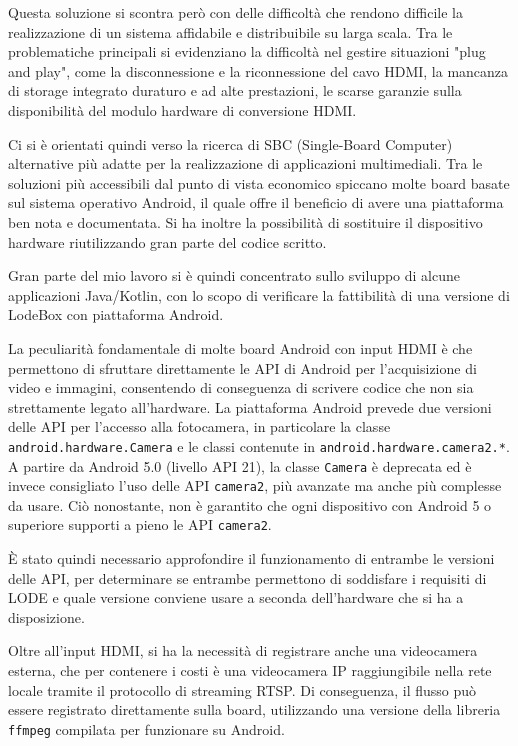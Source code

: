Questa soluzione si scontra però con delle difficoltà che rendono difficile la realizzazione di un sistema affidabile e distribuibile su larga scala. Tra le problematiche principali si evidenziano la difficoltà nel gestire situazioni "plug and play", come la disconnessione e la riconnessione del cavo HDMI, la mancanza di storage integrato duraturo e ad alte prestazioni, le scarse garanzie sulla disponibilità del modulo hardware di conversione HDMI.

Ci si è orientati quindi verso la ricerca di SBC (Single-Board Computer) alternative più adatte per la realizzazione di applicazioni multimediali. Tra le soluzioni più accessibili dal punto di vista economico spiccano molte board basate sul sistema operativo Android, il quale offre il beneficio di avere una piattaforma ben nota e documentata. Si ha inoltre la possibilità di sostituire il dispositivo hardware riutilizzando gran parte del codice scritto.

Gran parte del mio lavoro si è quindi concentrato sullo sviluppo di alcune applicazioni Java/Kotlin, con lo scopo di verificare la fattibilità di una versione di LodeBox con piattaforma Android.

La peculiarità fondamentale di molte board Android con input HDMI è che permettono di sfruttare direttamente le API di Android per l'acquisizione di video e immagini, consentendo di conseguenza di scrivere codice che non sia strettamente legato all'hardware. La piattaforma Android prevede due versioni delle API per l'accesso alla fotocamera, in particolare la classe \texttt{android.hardware.Camera} e le classi contenute in \texttt{android.hardware.camera2.*}. A partire da Android 5.0 (livello API 21), la classe \texttt{Camera} è deprecata ed è invece consigliato l'uso delle API \texttt{camera2}, più avanzate ma anche più complesse da usare. Ciò nonostante, non è garantito che ogni dispositivo con Android 5 o superiore supporti a pieno le API \texttt{camera2}.

È stato quindi necessario approfondire il funzionamento di entrambe le versioni delle API, per determinare se entrambe permettono di soddisfare i requisiti di LODE e quale versione conviene usare a seconda dell'hardware che si ha a disposizione.

Oltre all'input HDMI, si ha la necessità di registrare anche una videocamera esterna, che per contenere i costi è una videocamera IP raggiungibile nella rete locale tramite il protocollo di streaming RTSP. Di conseguenza, il flusso può essere registrato direttamente sulla board, utilizzando una versione della libreria \texttt{ffmpeg} compilata per funzionare su Android.

